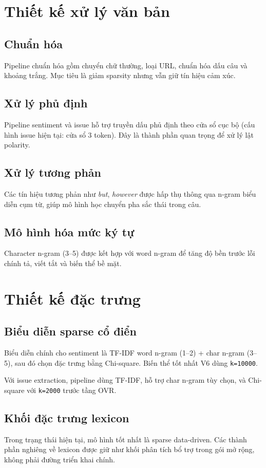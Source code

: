 ﻿\documentclass[12pt,a4paper]{article}
\begin{document}
\section{Thiết kế xử lý văn bản}
\subsection{Chuẩn hóa}
Pipeline chuẩn hóa gồm chuyển chữ thường, loại URL, chuẩn hóa dấu câu và khoảng trắng. Mục tiêu là giảm sparsity nhưng vẫn giữ tín hiệu cảm xúc.

\subsection{Xử lý phủ định}
Pipeline sentiment và issue hỗ trợ truyền dấu phủ định theo cửa sổ cục bộ (cấu hình issue hiện tại: cửa sổ 3 token). Đây là thành phần quan trọng để xử lý lật polarity.

\subsection{Xử lý tương phản}
Các tín hiệu tương phản như \textit{but}, \textit{however} được hấp thụ thông qua n-gram biểu diễn cụm từ, giúp mô hình học chuyển pha sắc thái trong câu.

\subsection{Mô hình hóa mức ký tự}
Character n-gram (3--5) được kết hợp với word n-gram để tăng độ bền trước lỗi chính tả, viết tắt và biến thể bề mặt.

\section{Thiết kế đặc trưng}
\subsection{Biểu diễn sparse cổ điển}
Biểu diễn chính cho sentiment là TF-IDF word n-gram (1--2) + char n-gram (3--5), sau đó chọn đặc trưng bằng Chi-square. Biến thể tốt nhất V6 dùng \texttt{k=10000}.

Với issue extraction, pipeline dùng TF-IDF, hỗ trợ char n-gram tùy chọn, và Chi-square với \texttt{k=2000} trước tầng OVR.

\subsection{Khối đặc trưng lexicon}
Trong trạng thái hiện tại, mô hình tốt nhất là sparse data-driven. Các thành phần nghiêng về lexicon được giữ như khối phân tích bổ trợ trong gói mở rộng, không phải đường triển khai chính.
\end{document}
